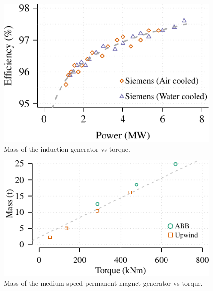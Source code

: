 \documentclass{article}\usepackage{graphicx, color}
\makeatletter
\def\maxwidth{ %
  \ifdim\Gin@nat@width>\linewidth
    \linewidth
  \else
    \Gin@nat@width
  \fi
}
\newenvironment{knitrout}{}{} %
\makeatother
\begin{document}
\begin{knitrout}
\color{fgcolor}\begin{figure}[]

\includegraphics[width=\maxwidth]{figure/induction_generator_eeficiency} \caption[Mass of the induction generator vs torque]{Mass of the induction generator vs torque.\label{fig:induction_generator_eeficiency}}
\end{figure}


\end{knitrout}



\begin{knitrout}
\color{fgcolor}\begin{figure}[]

\includegraphics[width=\maxwidth]{figure/plot1gpm} \caption[Mass of the medium speed permanent magnet generator vs torque]{Mass of the medium speed permanent magnet generator vs torque.\label{fig:plot1gpm}}
\end{figure}


\end{knitrout}
\end{document}
